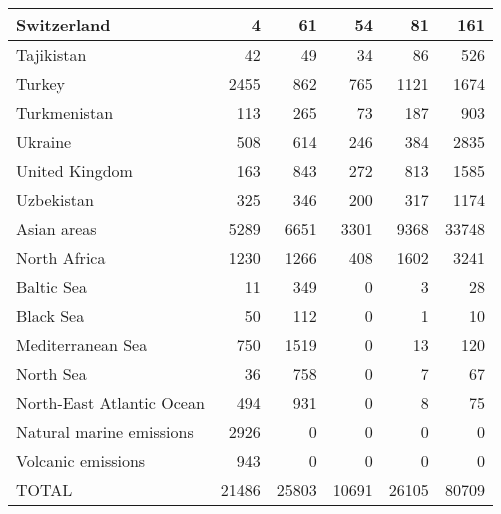 \begin{table}
\begin{center}
\begin{tabular}{|l|r|r|r|r|r|}
                   Switzerland&     4&    61&    54&    81&   161 \\\hline
                    Tajikistan&    42&    49&    34&    86&   526 \\\hline
                        Turkey&  2455&   862&   765&  1121&  1674 \\\hline
                  Turkmenistan&   113&   265&    73&   187&   903 \\\hline
                       Ukraine&   508&   614&   246&   384&  2835 \\\hline
                United Kingdom&   163&   843&   272&   813&  1585 \\\hline
                    Uzbekistan&   325&   346&   200&   317&  1174 \\\hline
                   Asian areas&  5289&  6651&  3301&  9368& 33748 \\\hline
                  North Africa&  1230&  1266&   408&  1602&  3241 \\\hline
                    Baltic Sea&    11&   349&     0&     3&    28 \\\hline
                     Black Sea&    50&   112&     0&     1&    10 \\\hline
             Mediterranean Sea&   750&  1519&     0&    13&   120 \\\hline
                     North Sea&    36&   758&     0&     7&    67 \\\hline
     North-East Atlantic Ocean&   494&   931&     0&     8&    75 \\\hline
      Natural marine emissions&  2926&     0&     0&     0&     0 \\\hline
            Volcanic emissions&   943&     0&     0&     0&     0 \\\hline\hline
                         TOTAL& 21486& 25803& 10691& 26105& 80709 \\\hline

\end{tabular}
\end{center}
\end{table}


\clearpage
 
